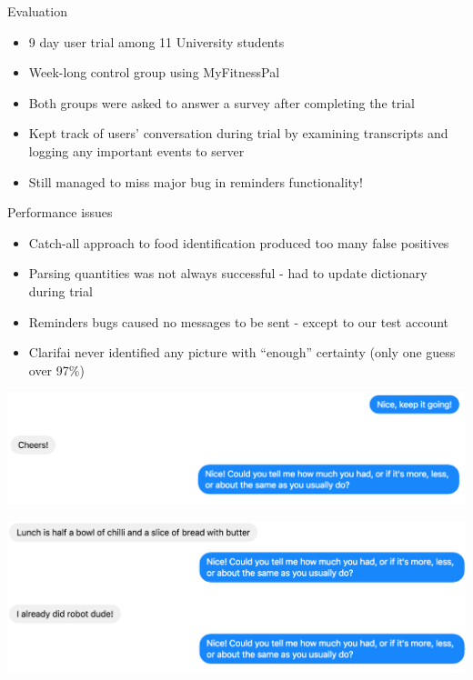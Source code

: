 \documentclass[landscape]{infslides}
\begin{document}
\begin{slide}{Evaluation}
    \begin{itemize}
        \item 9 day user trial among 11 University students
        \item Week-long control group using MyFitnessPal
        \item Both groups were asked to answer a survey after completing the trial
        \item Kept track of users' conversation during trial by examining transcripts and logging any important events to server
        \item Still managed to miss major bug in reminders functionality!
    \end{itemize}
\end{slide}
\begin{slide}{Performance issues}
    \begin{itemize}
        \item Catch-all approach to food identification produced too many false positives
        \item Parsing quantities was not always successful - had to update dictionary during trial
        \item Reminders bugs caused no messages to be sent - except to our test account
        \item Clarifai never identified any picture with ``enough'' certainty (only one guess over 97\%)
    \end{itemize}
\end{slide}
\begin{slide}{}
    \includegraphics[width=\textwidth]{Nice7.png}

    \includegraphics[width=\textwidth]{Nice2.png}
\end{slide}
\end{document}
